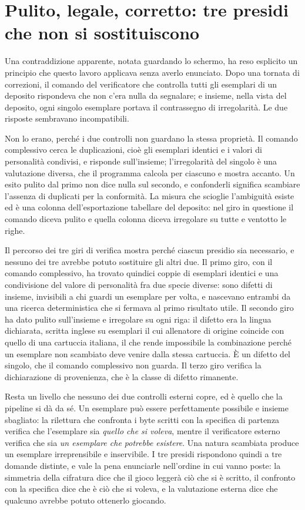 \section{Pulito, legale, corretto: tre presidi che non si sostituiscono}

Una contraddizione apparente, notata guardando lo schermo, ha reso esplicito un principio che questo lavoro applicava senza averlo enunciato. Dopo una tornata di correzioni, il comando del verificatore che controlla tutti gli esemplari di un deposito rispondeva che non c'era nulla da segnalare; e insieme, nella vista del deposito, ogni singolo esemplare portava il contrassegno di irregolarità. Le due risposte sembravano incompatibili.

Non lo erano, perché i due controlli non guardano la stessa proprietà. Il comando complessivo cerca le duplicazioni, cioè gli esemplari identici e i valori di personalità condivisi, e risponde sull'insieme; l'irregolarità del singolo è una valutazione diversa, che il programma calcola per ciascuno e mostra accanto. Un esito pulito dal primo non dice nulla sul secondo, e confonderli significa scambiare l'assenza di duplicati per la conformità. La misura che scioglie l'ambiguità esiste ed è una colonna dell'esportazione tabellare del deposito: nel giro in questione il comando diceva pulito e quella colonna diceva irregolare su tutte e ventotto le righe.

Il percorso dei tre giri di verifica mostra perché ciascun presidio sia necessario, e nessuno dei tre avrebbe potuto sostituire gli altri due. Il primo giro, con il comando complessivo, ha trovato quindici coppie di esemplari identici e una condivisione del valore di personalità fra due specie diverse: sono difetti di insieme, invisibili a chi guardi un esemplare per volta, e nascevano entrambi da una ricerca deterministica che si fermava al primo risultato utile. Il secondo giro ha dato pulito sull'insieme e irregolare su ogni riga: il difetto era la lingua dichiarata, scritta inglese su esemplari il cui allenatore di origine coincide con quello di una cartuccia italiana, il che rende impossibile la combinazione perché un esemplare non scambiato deve venire dalla stessa cartuccia. È un difetto del singolo, che il comando complessivo non guarda. Il terzo giro verifica la dichiarazione di provenienza, che è la classe di difetto rimanente.

Resta un livello che nessuno dei due controlli esterni copre, ed è quello che la pipeline si dà da sé. Un esemplare può essere perfettamente possibile e insieme sbagliato: la rilettura che confronta i byte scritti con la specifica di partenza verifica che l'esemplare sia \emph{quello che si voleva}, mentre il verificatore esterno verifica che sia \emph{un esemplare che potrebbe esistere}. Una natura scambiata produce un esemplare irreprensibile e inservibile. I tre presidi rispondono quindi a tre domande distinte, e vale la pena enunciarle nell'ordine in cui vanno poste: la simmetria della cifratura dice che il gioco leggerà ciò che si è scritto, il confronto con la specifica dice che è ciò che si voleva, e la valutazione esterna dice che qualcuno avrebbe potuto ottenerlo giocando.


